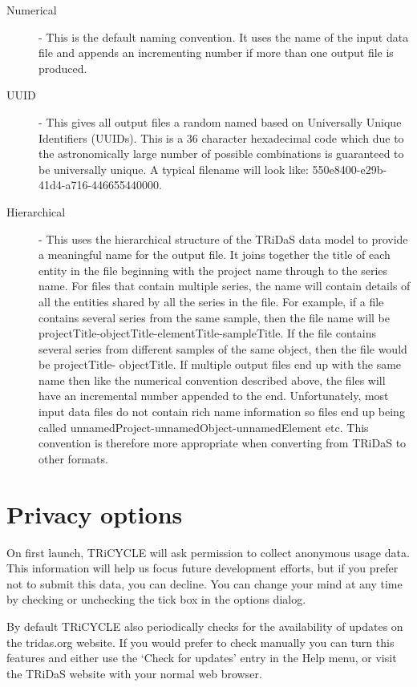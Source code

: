 \documentclass[10pt, headsepline,DIV14,BCOR0.5cm]{scrreprt}
\begin{document}
\begin{description}
 \item[Numerical] - This is the default naming convention. It uses the name of the input data file and
appends an incrementing number if more than one output file is produced.
 \item[UUID] - This gives all output files a random named based on Universally Unique Identifiers
(UUIDs). This is a 36 character hexadecimal code which due to the astronomically
large number of possible combinations is guaranteed to be universally unique. A
typical filename will look like: 550e8400-e29b-41d4-a716-446655440000.
 \item[Hierarchical] - This uses the hierarchical structure of the TRiDaS data model to provide a meaningful
name for the output file. It joins together the title of each entity in the file beginning
with the project name through to the series name. For files that contain multiple series,
the name will contain details of all the entities shared by all the series in the file. For
example, if a file contains several series from the same sample, then the file name
will be projectTitle-objectTitle-elementTitle-sampleTitle. If the file contains several
series from different samples of the same object, then the file would be projectTitle-
objectTitle. If multiple output files end up with the same name then like the numerical
convention described above, the files will have an incremental number appended to
the end. Unfortunately, most input data files do not contain rich name information
so files end up being called unnamedProject-unnamedObject-unnamedElement etc.
This convention is therefore more appropriate when converting from TRiDaS to other
formats.
 \end{description}

\section{Privacy options}

On first launch, TRiCYCLE will ask permission to collect anonymous usage data.  This information will help us focus future development efforts, but if you prefer not to submit this data, you can decline.  You can change your mind at any time by checking or unchecking the tick box in the options dialog.

By default TRiCYCLE also periodically checks for the availability of updates on the tridas.org website.  If you would prefer to check manually you can turn this features and either use the `Check for updates' entry in the Help menu, or visit the TRiDaS website with your normal web browser.
\end{document}
